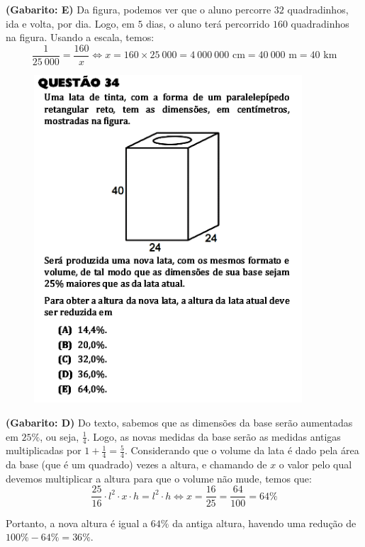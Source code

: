 \documentclass[a4paper]{article}
\begin{document}
\par\textbf{(Gabarito: E)} Da figura, podemos ver que o aluno percorre $32$ quadradinhos, ida e volta, por dia. Logo, em $5$ dias, o aluno terá percorrido $160$ quadradinhos na figura. Usando a escala, temos:
\begin{equation*}
\frac{1}{25\ 000} = \frac{160}{x} \iff x = 160\times 25\ 000 = 4\ 000\ 000\text{ cm} = 40\ 000 \text{ m} = 40\text{ km}
\end{equation*}
\begin{figure}[H]
	\begin{center}
		\includegraphics[width=10cm]{L2Q34.png}
	\end{center}
\end{figure}
\par\textbf{(Gabarito: D)} Do texto, sabemos que as dimensões da base serão aumentadas em $25\%$, ou seja, $\displaystyle{ \frac{1}{4} }$. Logo, as novas medidas da base serão as medidas antigas multiplicadas por $\displaystyle{ 1 + \frac{1}{4} = \frac{5}{4} }$. Considerando que o volume da lata é dado pela área da base (que é um quadrado) vezes a altura, e chamando de $x$ o valor pelo qual devemos multiplicar a altura para que o volume não mude, temos que: 
\begin{equation*}
\frac{25}{16}\cdot l^2\cdot x\cdot h = l^2\cdot h \iff x = \frac{16}{25} = \frac{64}{100} = 64\%
\end{equation*}
\par\vspace{0.3cm} Portanto, a nova altura é igual a $64\%$ da antiga altura, havendo uma redução de $100\% - 64\% = 36\%$.
\end{document}
